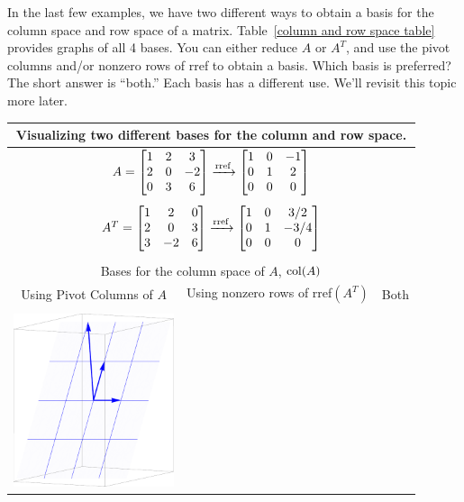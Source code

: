 In the last few examples, we have two different ways to obtain a basis for the column space and row space of a matrix. Table~\ref{column and row space table} provides graphs of all 4 bases. You can either reduce $A$ or $A^T$, and use the pivot columns and/or nonzero rows of rref to obtain a basis. Which basis is preferred?  The short answer is ``both.''  Each basis has a different use.  We'll revisit this topic more later.

\begin{table}

\begin{tabular}{ccc}
\multicolumn{3}{c}{
Visualizing two different bases for the column and row space. 
}
\\\hline
\multicolumn{3}{c}{
$
A=
\begin{bmatrix}
\begin{matrix} 1\\2\\0 \end{matrix}
&\begin{matrix} 2\\0\\3 \end{matrix}
&\begin{matrix} 3\\-2\\6 \end{matrix}
\end{bmatrix}
\xrightarrow{\operatorname{rref}}
\begin{bmatrix}
\begin{matrix} 1\\0\\0 \end{matrix}
&\begin{matrix} 0\\1\\0 \end{matrix}
&\begin{matrix} -1\\2\\0 \end{matrix}
\end{bmatrix}
$}
\\ \\
\multicolumn{3}{c}{
$
A^T
=
\begin{bmatrix}
 1 & 2 & 0 \\
 2 & 0 & 3 \\
 3 & -2 & 6
\end{bmatrix}
\xrightarrow{\operatorname{rref}}
\begin{bmatrix}
 1 & 0 & {3}/{2} \\
 0 & 1 & -{3}/{4} \\
 0 & 0 & 0
\end{bmatrix}
$
}
\\ \\
\hline\hline \multicolumn{3}{c}{Bases for the column space of $A$, $\operatorname{col}(A)$}\\
\hline Using Pivot Columns of $A$ & Using nonzero rows of rref$(A^T)$ & Both\\ \\
\includegraphics[height=2in]{02-Applications/support/colspace1}

\end{tabular}
\end{table}
